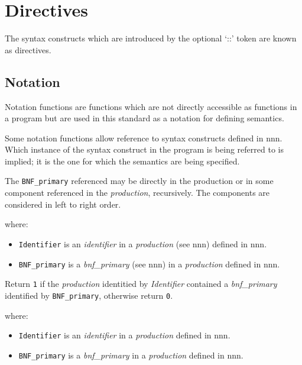 \chapter{Directives}\label{directives}

The syntax constructs which are introduced by the optional `::' token
are known as directives.

\section{Notation}\label{notation}

Notation functions are functions which are not directly accessible as
functions in a program but are used in this standard as a notation for
defining semantics.

Some notation functions allow reference to syntax constructs defined in
nnn. Which instance of the syntax construct in the program is being
referred to is implied; it is the one for which the semantics are being
specified.

The \texttt{BNF\_primary} referenced may be directly in the production
or in some component referenced in the \emph{production}, recursively.
The components are considered in left to right order.



where:

\begin{itemize}
\tightlist
\item
  \texttt{Identifier} is an \emph{identifier} in a \emph{production}
  (see nnn) defined in nnn.
\item
  \texttt{BNF\_primary} is a \emph{bnf\_primary} (see nnn) in a
  \emph{production} defined in nnn.
\end{itemize}

Return \texttt{\textquotesingle{}1\textquotesingle{}} if the
\emph{production} identitied by \emph{Identifier} contained a
\emph{bnf\_primary} identified by \texttt{BNF\_primary}, otherwise
return \texttt{\textquotesingle{}0\textquotesingle{}}.



where:

\begin{itemize}
\tightlist
\item
  \texttt{Identifier} is an \emph{identifier} in a \emph{production}
  defined in nnn.
\item
  \texttt{BNF\_primary} is a \emph{bnf\_primary} in a \emph{production}
  defined in nnn.
\end{itemize}

